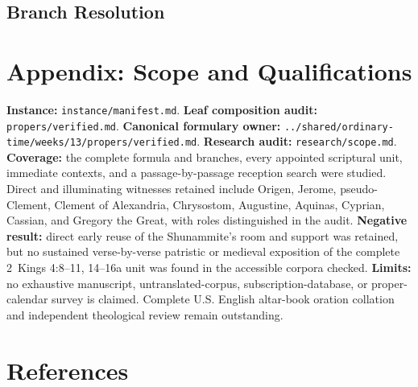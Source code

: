 \begin{deepstudy}
\subsection*{Branch Resolution}
\begin{branchstable}
\end{branchstable}

\clearpage

\section*{Appendix: Scope and Qualifications}

\begin{studyframe}
\textbf{Instance:} \nolinkurl{instance/manifest.md}. \textbf{Leaf composition audit:} \nolinkurl{propers/verified.md}. \textbf{Canonical formulary owner:} \nolinkurl{../shared/ordinary-time/weeks/13/propers/verified.md}. \textbf{Research audit:} \nolinkurl{research/scope.md}. \textbf{Coverage:} the complete formula and branches, every appointed scriptural unit, immediate contexts, and a passage-by-passage reception search were studied. Direct and illuminating witnesses retained include Origen, Jerome, pseudo-Clement, Clement of Alexandria, Chrysostom, Augustine, Aquinas, Cyprian, Cassian, and Gregory the Great, with roles distinguished in the audit. \textbf{Negative result:} direct early reuse of the Shunammite's room and support was retained, but no sustained verse-by-verse patristic or medieval exposition of the complete 2~Kings 4:8--11, 14--16a unit was found in the accessible corpora checked. \textbf{Limits:} no exhaustive manuscript, untranslated-corpus, subscription-database, or proper-calendar survey is claimed. Complete U.S. English altar-book oration collation and independent theological review remain outstanding.
\end{studyframe}

\section*{References}


\end{deepstudy}
